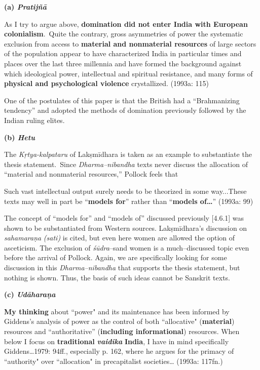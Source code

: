 \textbf{(a) \textit{Pratijñā}}

\begin{myquote}
As I try to argue above, \textbf{domination did not enter India with European colonialism}.~Quite the contrary, gross asymmetries of power the systematic exclusion from access to \textbf{material and nonmaterial resources} of large sectors of the population appear to have characterized India in particular times and places over the last three millennia and have formed the background against which ideological power, intellectual and spiritual resistance, and many forms of \textbf{physical and psychological violence} crystallized. (1993a: 115)
\end{myquote}

One of the postulates of this paper is that the British had a “Brahmanizing tendency” and adopted the methods of domination previously followed by the Indian ruling elites.

\textbf{(b) \textit{Hetu}}

The \textit{Kṛtya-kalpataru} of Lakṣmīdhara is taken as an example to substantiate the thesis statement.~Since \textit{Dharma–nibandha} texts never discuss the allocation of “material and nonmaterial resources,” Pollock feels that

\begin{myquote}
Such vast intellectual output surely needs to be theorized in some way...These texts may well in part be ``\textbf{models for}'' rather than ``\textbf{models of…}” (1993a: 99)
\end{myquote}

The concept of “models for” and “models of” discussed previously [4.6.1] was shown to be substantiated from Western sources. Lakṣmīdhara’s discussion on \textit{sahamaraṇa} \textit{(sati)} is cited, but even here women are allowed the option of asceticism. The exclusion of \textit{śūdra}–s\break and women is a much–discussed topic even before the arrival of Pollock. Again, we are specifically looking for some discussion in this \textit{Dharma–nibandha} that supports the thesis statement, but nothing is shown. Thus, the basis of such ideas cannot be Sanskrit texts.

\textbf{(c) \textit{Udāharaṇa}}

\begin{myquote}
\textbf{My thinking} about ``power" and its maintenance has been informed by Giddens's analysis of power as the control of both ``allocative" (\textbf{material}) resources and ``authoritative'' (\textbf{including informational}) resources. When below I focus on \textbf{traditional }\textit{\textbf{vaidika }}\textbf{India}, I have in mind specifically Giddens…1979: 94ff., especially p. 162, where he argues for the primacy of ``authority" over ``allocation" in precapitalist societies… (1993a: 117fn.)
\end{myquote}

